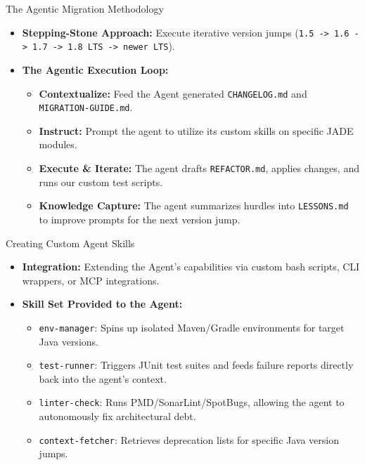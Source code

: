 \documentclass[aspectratio=169]{beamer}
\begin{document}
\begin{frame}{The Agentic Migration Methodology}
\begin{itemize}
  \item \textbf{Stepping-Stone Approach:} Execute iterative version jumps (\texttt{1.5 -> 1.6 -> 1.7 -> 1.8 LTS -> newer LTS}).
  \item \textbf{The Agentic Execution Loop:}
  \begin{itemize}
    \item \textbf{Contextualize:} Feed the Agent generated \texttt{CHANGELOG.md} and \texttt{MIGRATION-GUIDE.md}.
    \item \textbf{Instruct:} Prompt the agent to utilize its custom skills on specific JADE modules.
    \item \textbf{Execute \& Iterate:} The agent drafts \texttt{REFACTOR.md}, applies changes, and runs our custom test scripts.
    \item \textbf{Knowledge Capture:} The agent summarizes hurdles into \texttt{LESSONS.md} to improve prompts for the next version jump.
  \end{itemize}
\end{itemize}
\end{frame}

\begin{frame}{Creating Custom Agent Skills}
\begin{itemize}
  \item \textbf{Integration:} Extending the Agent's capabilities via custom bash scripts, CLI wrappers, or MCP integrations.
  \item \textbf{Skill Set Provided to the Agent:}
  \begin{itemize}
    \item \texttt{env-manager}: Spins up isolated Maven/Gradle environments for target Java versions.
    \item \texttt{test-runner}: Triggers JUnit test suites and feeds failure reports directly back into the agent's context.
    \item \texttt{linter-check}: Runs PMD/SonarLint/SpotBugs, allowing the agent to autonomously fix architectural debt.
    \item \texttt{context-fetcher}: Retrieves deprecation lists for specific Java version jumps.
  \end{itemize}
\end{itemize}
\end{frame}
\end{document}
